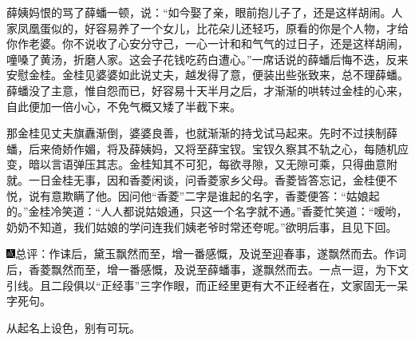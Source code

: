 薛姨妈恨的骂了薛蟠一顿，说：“如今娶了亲，眼前抱儿子了，还是这样胡闹。人家凤凰蛋似的，好容易养了一个女儿，比花朵儿还轻巧，原看的你是个人物，才给你作老婆。你不说收了心安分守己，一心一计和和气气的过日子，还是这样胡闹，噇嗓了黄汤，折磨人家。这会子花钱吃药白遭心。”一席话说的薛蟠后悔不迭，反来安慰金桂。金桂见婆婆如此说丈夫，越发得了意，便装出些张致来，总不理薛蟠。薛蟠没了主意，惟自怨而已，好容易十天半月之后，才渐渐的哄转过金桂的心来，自此便加一倍小心，不免气概又矮了半截下来。

那金桂见丈夫旗纛渐倒，婆婆良善，也就渐渐的持戈试马起来。先时不过挟制薛蟠，后来倚娇作媚，将及薛姨妈，又将至薛宝钗。宝钗久察其不轨之心，每随机应变，暗以言语弹压其志。金桂知其不可犯，每欲寻隙，又无隙可乘，只得曲意附就。一日金桂无事，因和香菱闲谈，问香菱家乡父母。香菱皆答忘记，金桂便不悦，说有意欺瞒了他。因问他“香菱”二字是谁起的名字，香菱便答：“姑娘起的。”金桂冷笑道：“人人都说姑娘通，只这一个名字就不通。”香菱忙笑道：“嗳哟，奶奶不知道，我们姑娘的学问连我们姨老爷时常还夸呢。”欲明后事，且见下回。

{\includegraphics[width=3mm]{../Images/00005}\kaishu 总评：作诔后，黛玉飘然而至，增一番感慨，及说至迎春事，遂飘然而去。作词后，香菱飘然而至，增一番感慨，及说至薛蟠事，遂飘然而去。一点一逗，为下文引线。且二段俱以“正经事”三字作眼，而正经里更有大不正经者在，文家固无一呆字死句。}

{\kaishu 从起名上设色，别有可玩。}
